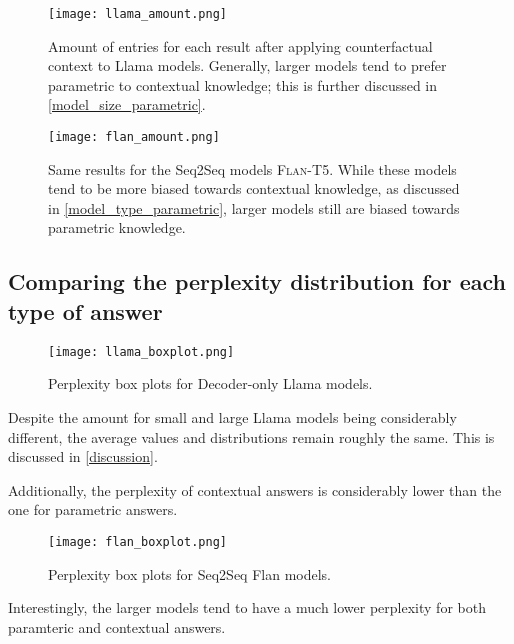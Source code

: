 \begin{figure}[ht]
	\centering
	\texttt{[image: llama\_amount.png]}
	\caption{Amount of entries for each result after applying counterfactual context to Llama models. Generally, larger models tend to prefer parametric to contextual knowledge; this is further discussed in \cref{model_size_parametric}.}
\end{figure}

\begin{figure}[ht]
	\centering
	\texttt{[image: flan\_amount.png]}
	\caption{Same results for the Seq2Seq models \textsc{Flan-T5}. While these models tend to be more biased towards contextual knowledge, as discussed in \cref{model_type_parametric}, larger models still are biased towards parametric knowledge.}
\end{figure}

\subsection{Comparing the perplexity distribution for each type of answer}
\begin{figure}[ht]
	\centering
	\texttt{[image: llama\_boxplot.png]}
	\caption{Perplexity box plots for Decoder-only Llama models.}
\end{figure}

Despite the amount for small and large Llama models being considerably different, the average values and distributions remain roughly the same.
This is discussed in \cref{discussion}.

Additionally, the perplexity of contextual answers is considerably lower than the one for parametric answers.

\begin{figure}[ht]
	\centering
	\texttt{[image: flan\_boxplot.png]}
	\caption{Perplexity box plots for Seq2Seq Flan models.}
\end{figure}

Interestingly, the larger models tend to have a much lower perplexity for both paramteric and contextual answers.
